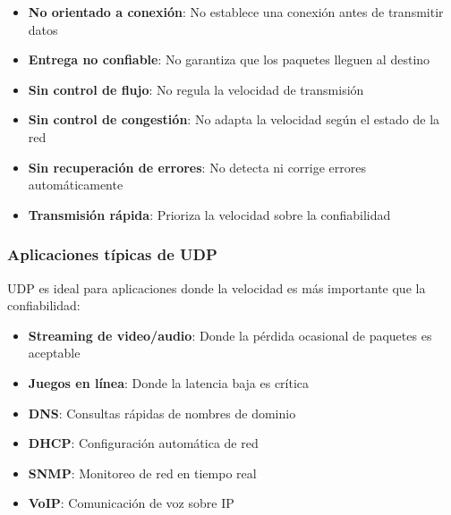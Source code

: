 \begin{itemize}
    \item \textbf{No orientado a conexión}: No establece una conexión antes de transmitir datos
    \item \textbf{Entrega no confiable}: No garantiza que los paquetes lleguen al destino
    \item \textbf{Sin control de flujo}: No regula la velocidad de transmisión
    \item \textbf{Sin control de congestión}: No adapta la velocidad según el estado de la red
    \item \textbf{Sin recuperación de errores}: No detecta ni corrige errores automáticamente
    \item \textbf{Transmisión rápida}: Prioriza la velocidad sobre la confiabilidad
\end{itemize}

\subsubsection{Aplicaciones típicas de UDP}

UDP es ideal para aplicaciones donde la velocidad es más importante que la confiabilidad:

\begin{itemize}
    \item \textbf{Streaming de video/audio}: Donde la pérdida ocasional de paquetes es aceptable
    \item \textbf{Juegos en línea}: Donde la latencia baja es crítica
    \item \textbf{DNS}: Consultas rápidas de nombres de dominio
    \item \textbf{DHCP}: Configuración automática de red
    \item \textbf{SNMP}: Monitoreo de red en tiempo real
    \item \textbf{VoIP}: Comunicación de voz sobre IP
\end{itemize}


